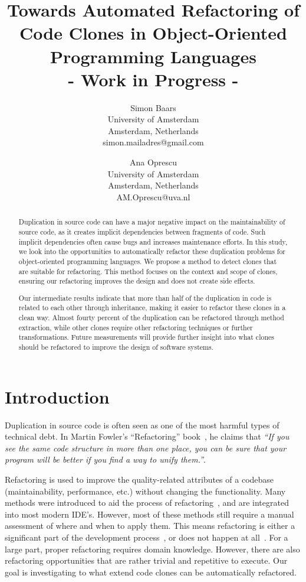 \documentclass[a4paper]{article}
\title{Towards Automated Refactoring of Code Clones in Object-Oriented Programming Languages\\- Work in Progress -}
\author{
Simon Baars \\ University of Amsterdam\\
                Amsterdam, Netherlands \\ simon.mailadres@gmail.com
\and
Ana Oprescu \\ University of Amsterdam\\
                Amsterdam, Netherlands \\
                AM.Oprescu@uva.nl
}
\begin{document}
\maketitle

\begin{abstract}
Duplication in source code can have a major negative impact on the maintainability of source code, as it creates implicit dependencies between fragments of code. Such implicit dependencies often cause bugs and increases maintenance efforts. In this study, we look into the opportunities to automatically refactor these duplication problems for object-oriented programming languages. We propose a method to detect clones that are suitable for refactoring. This method focuses on the context and scope of clones, ensuring our refactoring improves the design and does not create side effects.

Our intermediate results indicate that more than half of the duplication in code is related to each other through inheritance, making it easier to refactor these clones in a clean way. Almost fourty percent of the duplication can be refactored through method extraction, while other clones require other refactoring techniques or further transformations. Future measurements will provide further insight into what clones should be refactored to improve the design of software systems.
\end{abstract}

\section{Introduction}
Duplication in source code is often seen as one of the most harmful types of technical debt. In Martin Fowler's ``Refactoring'' book~\cite{fowler1999refactoring}, he claims that \textit{``If you see the same code structure in more than one place, you can be sure that your program will be better if you find a way to unify them.''}.

Refactoring is used to improve the quality-related attributes of a codebase (maintainability, performance, etc.) without changing the functionality. Many methods were introduced to aid the process of refactoring~\cite{fowler1999refactoring, wake2004refactoring}, and are integrated into most modern IDE's. However, most of these methods still require a manual assessment of where and when to apply them. This means refactoring is either a significant part of the development process~\cite{lientz1978characteristics, mens2004survey}, or does not happen at all~\cite{mens2003refactoring}. For a large part, proper refactoring requires domain knowledge. However, there are also refactoring opportunities that are rather trivial and repetitive to execute. Our goal is investigating to what extend code clones can be automatically refactored.
\end{document}
